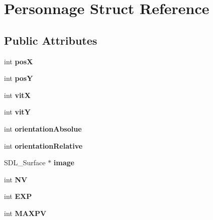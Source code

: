 \hypertarget{structPersonnage}{}\section{Personnage Struct Reference}
\label{structPersonnage}
\subsection*{Public Attributes}
\begin{DoxyCompactItemize}
\item 
\mbox{\label{structPersonnage_ab68ae3f7bd22992d382e9a7e5b816753}} 
int {\bfseries posX}
\item 
\mbox{\label{structPersonnage_ac0a3600213f050d2d394a8da7efdcb18}} 
int {\bfseries posY}
\item 
\mbox{\label{structPersonnage_a78789380101a6fc03419af8f2514809d}} 
int {\bfseries vitX}
\item 
\mbox{\label{structPersonnage_ac83c659149cc30a6f075ac34373e2422}} 
int {\bfseries vitY}
\item 
\mbox{\label{structPersonnage_a57c59ce058a29cfa8b9cae2bcebf7965}} 
int {\bfseries orientation\+Absolue}
\item 
\mbox{\label{structPersonnage_a9c3839fb3d82d08afe7a81238550e99f}} 
int {\bfseries orientation\+Relative}
\item 
\mbox{\label{structPersonnage_acb701ab5238c69a999a7accdfd5f2aad}} 
S\+D\+L\+\_\+\+Surface $\ast$ {\bfseries image}
\item 
\mbox{\label{structPersonnage_a67f6877142269db90250e5d846d28382}} 
int {\bfseries NV}
\item 
\mbox{\label{structPersonnage_a9262513ccc64e82e53cd42e9656bbf3f}} 
int {\bfseries E\+XP}
\item 
\mbox{\label{structPersonnage_a326f43ced93f78ab2542337085cee7d9}} 
int {\bfseries M\+A\+X\+PV}

\end{DoxyCompactItemize}

